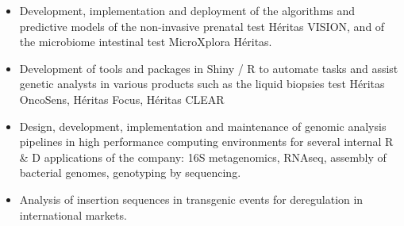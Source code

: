 \documentclass[10pt,a4paper,ragged2e]{altacv}
\begin{document}
\begin{itemize}
\item Development, implementation and deployment of the algorithms and predictive models of the non-invasive prenatal test
Héritas VISION, and of the microbiome intestinal test MicroXplora Héritas.
\item Development of tools and packages in Shiny / R to automate tasks and assist genetic analysts in various
products such as the liquid biopsies test Héritas OncoSens, Héritas Focus, Héritas CLEAR
\item Design, development, implementation and maintenance of genomic analysis pipelines in high performance computing environments
for several internal R & D applications of the company: 16S metagenomics, RNAseq, assembly of bacterial genomes, genotyping by sequencing.
\item Analysis of insertion sequences in transgenic events for deregulation in international markets.
\end{itemize}



\divider


\end{document}
